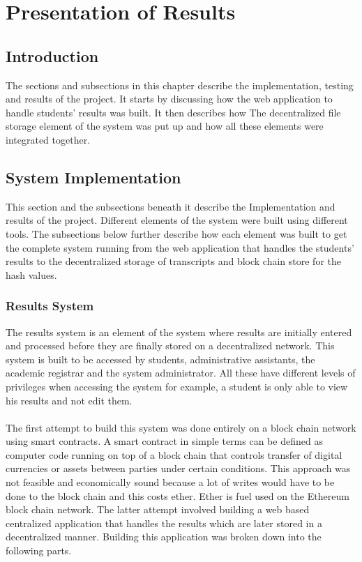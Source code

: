 \chapter{Presentation of Results}
\section{Introduction}
The sections and subsections in this chapter describe the implementation, testing and results of the project. It starts by discussing how the web application to handle students' results was built. It then describes how The decentralized file storage element of the system was put up and how all these elements were integrated together.

\section{System Implementation}
This section and the subsections beneath it describe the Implementation and results of the project. Different elements of the system were built using different tools. The subsections below further describe how each element was built to get the complete system running from the web application that handles the students' results to the decentralized storage of transcripts and block chain store for the hash values.

\subsection{Results System}
The results system is an element of the system where results are initially entered and processed before they are finally stored on a decentralized network. This system is built to be accessed by students, administrative assistants, the academic registrar and the system administrator. All these have different levels of privileges when accessing the system for example, a student is only able to view his results and not edit them. \\~\\
The first attempt to build this system was done entirely on a block chain network using smart contracts. A smart contract in simple terms can be defined as computer code running on top of a block chain that controls transfer of digital currencies or assets between parties under certain conditions\cite{20}. This approach was not feasible and economically sound because a lot of writes would have to be done to the block chain and this costs ether. Ether is fuel used on the Ethereum block chain network. The latter attempt involved building a web based centralized application that handles the results which are later stored in a decentralized manner. Building this application was broken down into the following parts.

